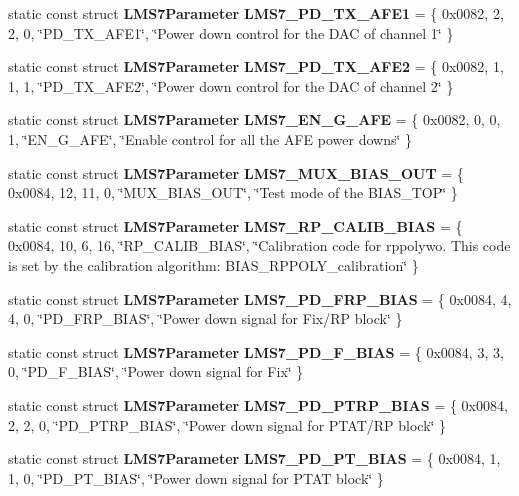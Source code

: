 \begin{DoxyCompactItemize}
\item 
static const struct {\bf L\+M\+S7\+Parameter} {\bf L\+M\+S7\+\_\+\+P\+D\+\_\+\+T\+X\+\_\+\+A\+F\+E1} = \{ 0x0082, 2, 2, 0, \char`\"{}\+P\+D\+\_\+\+T\+X\+\_\+\+A\+F\+E1\char`\"{}, \char`\"{}\+Power down control for the D\+A\+C of channel 1\char`\"{} \}
\item 
static const struct {\bf L\+M\+S7\+Parameter} {\bf L\+M\+S7\+\_\+\+P\+D\+\_\+\+T\+X\+\_\+\+A\+F\+E2} = \{ 0x0082, 1, 1, 1, \char`\"{}\+P\+D\+\_\+\+T\+X\+\_\+\+A\+F\+E2\char`\"{}, \char`\"{}\+Power down control for the D\+A\+C of channel 2\char`\"{} \}
\item 
static const struct {\bf L\+M\+S7\+Parameter} {\bf L\+M\+S7\+\_\+\+E\+N\+\_\+\+G\+\_\+\+A\+FE} = \{ 0x0082, 0, 0, 1, \char`\"{}\+E\+N\+\_\+\+G\+\_\+\+A\+F\+E\char`\"{}, \char`\"{}\+Enable control for all the A\+F\+E power downs\char`\"{} \}
\item 
static const struct {\bf L\+M\+S7\+Parameter} {\bf L\+M\+S7\+\_\+\+M\+U\+X\+\_\+\+B\+I\+A\+S\+\_\+\+O\+UT} = \{ 0x0084, 12, 11, 0, \char`\"{}\+M\+U\+X\+\_\+\+B\+I\+A\+S\+\_\+\+O\+U\+T\char`\"{}, \char`\"{}\+Test mode of the B\+I\+A\+S\+\_\+\+T\+O\+P\char`\"{} \}
\item 
static const struct {\bf L\+M\+S7\+Parameter} {\bf L\+M\+S7\+\_\+\+R\+P\+\_\+\+C\+A\+L\+I\+B\+\_\+\+B\+I\+AS} = \{ 0x0084, 10, 6, 16, \char`\"{}\+R\+P\+\_\+\+C\+A\+L\+I\+B\+\_\+\+B\+I\+A\+S\char`\"{}, \char`\"{}\+Calibration code for rppolywo. This code is set by the calibration algorithm\+: B\+I\+A\+S\+\_\+\+R\+P\+P\+O\+L\+Y\+\_\+calibration\char`\"{} \}
\item 
static const struct {\bf L\+M\+S7\+Parameter} {\bf L\+M\+S7\+\_\+\+P\+D\+\_\+\+F\+R\+P\+\_\+\+B\+I\+AS} = \{ 0x0084, 4, 4, 0, \char`\"{}\+P\+D\+\_\+\+F\+R\+P\+\_\+\+B\+I\+A\+S\char`\"{}, \char`\"{}\+Power down signal for Fix/\+R\+P block\char`\"{} \}
\item 
static const struct {\bf L\+M\+S7\+Parameter} {\bf L\+M\+S7\+\_\+\+P\+D\+\_\+\+F\+\_\+\+B\+I\+AS} = \{ 0x0084, 3, 3, 0, \char`\"{}\+P\+D\+\_\+\+F\+\_\+\+B\+I\+A\+S\char`\"{}, \char`\"{}\+Power down signal for Fix\char`\"{} \}
\item 
static const struct {\bf L\+M\+S7\+Parameter} {\bf L\+M\+S7\+\_\+\+P\+D\+\_\+\+P\+T\+R\+P\+\_\+\+B\+I\+AS} = \{ 0x0084, 2, 2, 0, \char`\"{}\+P\+D\+\_\+\+P\+T\+R\+P\+\_\+\+B\+I\+A\+S\char`\"{}, \char`\"{}\+Power down signal for P\+T\+A\+T/\+R\+P block\char`\"{} \}
\item 
static const struct {\bf L\+M\+S7\+Parameter} {\bf L\+M\+S7\+\_\+\+P\+D\+\_\+\+P\+T\+\_\+\+B\+I\+AS} = \{ 0x0084, 1, 1, 0, \char`\"{}\+P\+D\+\_\+\+P\+T\+\_\+\+B\+I\+A\+S\char`\"{}, \char`\"{}\+Power down signal for P\+T\+A\+T block\char`\"{} \}

\end{DoxyCompactItemize}
